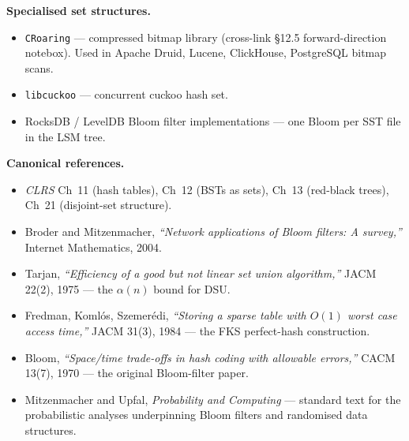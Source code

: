 \documentclass[11pt]{article}
\begin{document}
\begin{notebox}
\textbf{Specialised set structures.}
\begin{itemize}[leftmargin=*]
    \item \texttt{CRoaring} --- compressed bitmap library
          (cross-link \S12.5 forward-direction notebox). Used in
          Apache Druid, Lucene, ClickHouse, PostgreSQL bitmap
          scans.
    \item \texttt{libcuckoo} --- concurrent cuckoo hash set.
    \item RocksDB / LevelDB Bloom filter implementations --- one
          Bloom per SST file in the LSM tree.
\end{itemize}

\textbf{Canonical references.}
\begin{itemize}[leftmargin=*]
    \item \emph{CLRS} Ch~11 (hash tables), Ch~12 (BSTs as sets),
          Ch~13 (red-black trees), Ch~21 (disjoint-set
          structure).
    \item Broder and Mitzenmacher, \emph{``Network applications of
          Bloom filters: A survey,''} Internet Mathematics, 2004.
    \item Tarjan, \emph{``Efficiency of a good but not linear set
          union algorithm,''} JACM 22(2), 1975 --- the
          $\alpha(n)$ bound for DSU.
    \item Fredman, Komlós, Szemerédi, \emph{``Storing a sparse
          table with $O(1)$ worst case access time,''} JACM 31(3),
          1984 --- the FKS perfect-hash construction.
    \item Bloom, \emph{``Space/time trade-offs in hash coding with
          allowable errors,''} CACM 13(7), 1970 --- the original
          Bloom-filter paper.
    \item Mitzenmacher and Upfal, \emph{Probability and Computing}
          --- standard text for the probabilistic analyses
          underpinning Bloom filters and randomised data
          structures.
\end{itemize}
\end{notebox}
\end{document}
